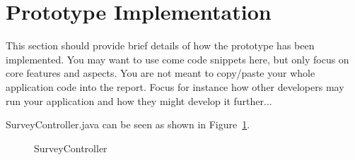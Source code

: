 \section{Prototype Implementation}
\label{sec:implementation}

This section should provide brief details of how the prototype has been implemented.
You may want to use come code snippets here, but only focus on core features and aspects.
You are not meant to copy/paste your whole application code into the report.
Focus for instance how other developers may run your application and how they might develop it further...


SurveyController.java can be seen as shown in Figure~\ref{fig:surveycontroller}.


\begin{figure}[!htbp]
	
	\caption{SurveyController}
	\label{fig:surveycontroller}
\end{figure}